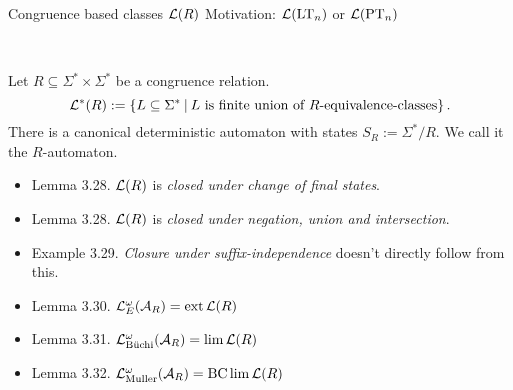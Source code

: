 \documentclass[
	notheorems,noamsthm]{beamer}
\begin{document}
\begin{frame}[<+->]{Congruence based classes $\mathcal{L}(R)$}
Motivation: $\mathcal{L}(\textup{\textrm{LT}}_n)$ or $\mathcal{L}(\textup{\textrm{PT}}_n)$

\

Let $R\subseteq\Sigma^* \times \Sigma^*$ be a congruence relation.
\[ \Lang^*(R) := \Set{L \subseteq \Sigma^*}{L \text{ is finite union of $R$-equivalence-classes}} . \]
There is a canonical deterministic automaton with states $S_R := \Sigma^*/R$. We call it the $R$-automaton.

\begin{itemize}
\item Lemma 3.28. $\mathcal{L}(R)$ is \emph{closed under change of final states}.
\item Lemma 3.28. $\mathcal{L}(R)$ is \emph{closed under negation, union and intersection}.
\item Example 3.29. \emph{Closure under suffix-independence} doesn't directly follow from this.
%
\item Lemma 3.30. $\mathcal{L}^\omega_E(\mathcal{A}_R) = \operatorname{ext} \mathcal{L}(R)$
\item Lemma 3.31. $\mathcal{L}^\omega_{\text{Büchi}}(\mathcal{A}_R) = \lim \mathcal{L}(R)$
\item Lemma 3.32. $\mathcal{L}^\omega_{\text{Muller}}(\mathcal{A}_R) = \operatorname{BC} \lim \mathcal{L}(R)$
\end{itemize}
\end{frame}
\end{document}
